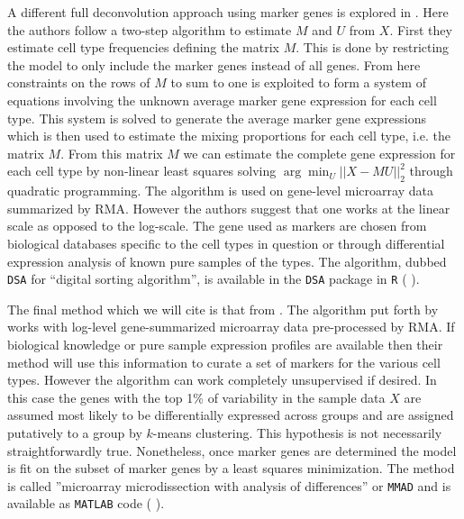 \documentclass[reqno,12pt,oneside]{report}\usepackage[]{graphicx}\usepackage[]{color}
\renewcommand{\citet}[1]{(\citeauthor{#1} \citeyear{#1})}
\theoremstyle{plain}
\theoremstyle{definition}
\theoremstyle{remark}
\numberwithin{theorem}{chapter}     %
\begin{document}
A different full deconvolution approach using marker genes is explored in \cite{Zhong2013}. Here the authors follow a two-step algorithm to estimate $M$ and $U$ from $X$. First they estimate cell type frequencies defining the matrix $M$. This is done by restricting the model to only include the marker genes instead of all genes. From here constraints on the rows of $M$ to sum to one is exploited to form a system of equations involving the unknown average marker gene expression for each cell type. This system is solved to generate the average marker gene expressions which is then used to estimate the mixing proportions for each cell type, i.e. the matrix $M$. From this matrix $M$ we can estimate the complete gene expression for each cell type by non-linear least squares solving $\arg\min_U||X-MU||_2^2$ through quadratic programming. The algorithm is used on gene-level microarray data summarized by RMA. However the authors suggest that one works at the linear scale as opposed to the log-scale. The gene used as markers are chosen from biological databases specific to the cell types in question or through differential expression analysis of known pure samples of the types. The algorithm, dubbed \verb+DSA+ for ``digital sorting algorithm'', is available in the \verb+DSA+ package in \verb+R+  \citet{Zhong2013}.

The final method which we will cite is that from \cite{Liebner2014}. The algorithm put forth by \citeauthor{Liebner2014} works with log-level gene-summarized microarray data pre-processed by RMA. If biological knowledge or pure sample expression profiles are available then their method will use this information to curate a set of markers for the various cell types. However the algorithm can work completely unsupervised if desired. In this case the genes with the top 1\% of variability in the sample data $X$ are assumed most likely to be differentially expressed across groups and are assigned putatively to a group by $k$-means clustering. This hypothesis is not necessarily straightforwardly true. Nonetheless, once marker genes are determined the model is fit on the subset of marker genes by a least squares minimization. The method is called ''microarray microdissection with analysis of differences'' or \verb+MMAD+ and is available as \verb+MATLAB+ code \citet{Liebner2014}.
\end{document}
